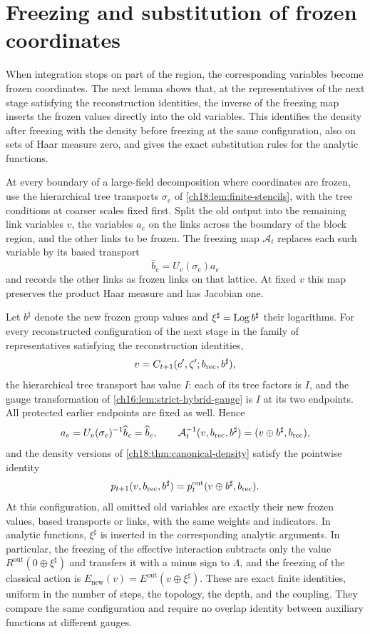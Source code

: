 \section{Freezing and substitution of frozen coordinates}\label{ch18:sec:freezing}

When integration stops on part of the region, the corresponding variables become frozen coordinates. The next lemma shows that, at the representatives of the next stage satisfying the reconstruction identities, the inverse of the freezing map inserts the frozen values directly into the old variables. This identifies the density after freezing with the density before freezing at the same configuration, also on sets of Haar measure zero, and gives the exact substitution rules for the analytic functions.

\begin{lemma}\label{ch18:lem:producer-consumer}
At every boundary of a large-field decomposition where coordinates are frozen, use the hierarchical tree transports $\sigma_e$ of \cref{ch18:lem:finite-stencils}, with the tree conditions at coarser scales fixed first. Split the old output into the remaining link variables $v$, the variables $a_e$ on the links across the boundary of the block region, and the other links to be frozen. The freezing map $\mathcal A_t$ replaces each such variable by its based transport
\[
 \widehat b_e=U_v(\sigma_e)a_e
\]
and records the other links as frozen links on that lattice. At fixed $v$ this map preserves the product Haar measure and has Jacobian one.

Let $b^\sharp$ denote the new frozen group values and $\xi^\sharp=\operatorname{Log} b^\sharp$ their logarithms. For every reconstructed configuration of the next stage in the family of representatives satisfying the reconstruction identities,
\[
 v=C_{t+1}(c',\zeta';b_{\mathrm{rec}},b^\sharp),
\]
the hierarchical tree transport has value $I$: each of its tree factors is $I$, and the gauge transformation of \cref{ch16:lem:strict-hybrid-gauge} is $I$ at its two endpoints. All protected earlier endpoints are fixed as well. Hence
\[
 a_e=U_v(\sigma_e)^{-1}\widehat b_e=\widehat b_e,
 \qquad
 \mathcal A_t^{-1}(v,b_{\mathrm{rec}},b^\sharp)=(v\oplus b^\sharp,b_{\mathrm{rec}}),
\]
and the density versions of \cref{ch18:thm:canonical-density} satisfy the pointwise identity
\[
 p_{t+1}(v,b_{\mathrm{rec}},b^\sharp)
                  =p_t^{\mathrm{out}}(v\oplus b^\sharp,b_{\mathrm{rec}}).
\]
At this configuration, all omitted old variables are exactly their new frozen values, based transports or links, with the same weights and indicators. In analytic functions, $\xi^\sharp$ is inserted in the corresponding analytic arguments. In particular, the freezing of the effective interaction subtracts only the value $R^{\mathrm{out}}(0\oplus\xi^\sharp)$ and transfers it with a minus sign to $\Lambda$, and the freezing of the classical action is $E_{\mathrm{new}}(v)=E^{\mathrm{out}}(v\oplus\xi^\sharp)$. These are exact finite identities, uniform in the number of steps, the topology, the depth, and the coupling. They compare the same configuration and require no overlap identity between auxiliary functions at different gauges.
\end{lemma}

